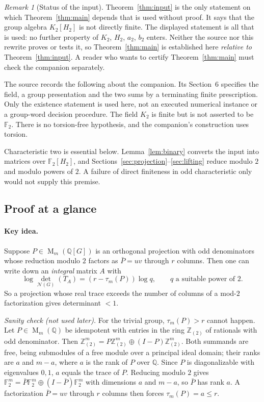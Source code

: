 \documentclass[11pt]{article}
\theoremstyle{remark}
\newtheorem{remark}[theorem]{Remark}
\numberwithin{equation}{section}
\newcommand{\F}{\mathbb F}
\newcommand{\Z}{\mathbb Z}
\newcommand{\Q}{\mathbb Q}
\newcommand{\Mat}{\operatorname{M}}
\newcommand{\N}{\mathcal N}
\begin{document}
\begin{remark}[Status of the input]\label{rem:input-status}
Theorem~\ref{thm:input} is the only statement on which Theorem~\ref{thm:main} depends that is used without proof. It says that the group algebra $K_2[H_2]$ is not directly finite. The displayed statement is all that is used: no further property of $K_2$, $H_2$, $a_2$, $b_2$ enters. Neither the source nor this rewrite proves or tests it, so Theorem~\ref{thm:main} is established here \emph{relative to} Theorem~\ref{thm:input}. A reader who wants to certify Theorem~\ref{thm:main} must check the companion separately.

The source records the following about the companion. Its Section~6 specifies the field, a group presentation and the two sums by a terminating finite prescription. Only the existence statement is used here, not an executed numerical instance or a group-word decision procedure. The field $K_2$ is finite but is not asserted to be $\F_2$. There is no torsion-free hypothesis, and the companion's construction uses torsion.

Characteristic two is essential below. Lemma~\ref{lem:binary} converts the input into matrices over $\F_2[H_2]$, and Sections~\ref{sec:projection}--\ref{sec:lifting} reduce modulo $2$ and modulo powers of $2$. A failure of direct finiteness in odd characteristic only would not supply this premise.
\end{remark}

\subsection{Proof at a glance}
\label{subsec:glance}

\paragraph{Key idea.}
Suppose $P\in\Mat_m(\Q[G])$ is an orthogonal projection with odd denominators whose reduction modulo $2$ factors as $\bar P=uv$ through $r$ columns. Then one can write down an \emph{integral} matrix $A$ with
\[
 \log\det_{\N(G)}(T_A)=(r-\tau_m(P))\log q,\qquad q\text{ a suitable power of }2 .
\]
So a projection whose real trace exceeds the number of columns of a mod-$2$ factorization gives determinant $<1$.

\emph{Sanity check (not used later).} For the trivial group, $\tau_m(P)>r$ cannot happen. Let $P\in\Mat_m(\Q)$ be idempotent with entries in the ring $\Z_{(2)}$ of rationals with odd denominator. Then $\Z_{(2)}^m=P\Z_{(2)}^m\oplus(I-P)\Z_{(2)}^m$. Both summands are free, being submodules of a free module over a principal ideal domain; their ranks are $a$ and $m-a$, where $a$ is the rank of $P$ over $\Q$. Since $P$ is diagonalizable with eigenvalues $0,1$, $a$ equals the trace of $P$. Reducing modulo $2$ gives $\F_2^m=\bar P\F_2^m\oplus(I-\bar P)\F_2^m$ with dimensions $a$ and $m-a$, so $\bar P$ has rank $a$. A factorization $\bar P=uv$ through $r$ columns then forces $\tau_m(P)=a\le r$.
\end{document}
